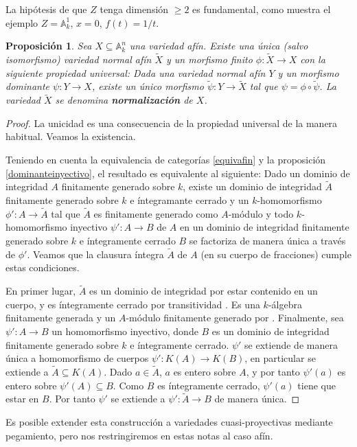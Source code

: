 \documentclass[a4paper,10pt]{book}
\newtheorem{prop}[thm]{Proposición}
\newcommand{\AAA}{\mathbb A}
\newcommand{\Ank}{\AAA^n_k}
\begin{document}
La hipótesis de que $Z$ tenga dimensión $\geq 2$ es fundamental, como muestra el ejemplo $Z=\AAA^1_k$, $x=0$, $f(t)=1/t$.

\begin{prop}
 Sea $X\subseteq\Ank$ una variedad afín. Existe una única (salvo isomorfismo) variedad normal afín $\tilde X$ y un morfismo finito $\phi:\tilde X\to X$ con la siguiente propiedad universal: Dada una variedad normal afín $Y$ y un morfismo dominante $\psi:Y\to X$, existe un único morfismo $\tilde\psi:Y\to\tilde X$ tal que $\psi=\phi\circ\tilde\psi$. La variedad $\tilde X$ se denomina {\bf normalización} de $X$.
\end{prop}

\begin{proof} La unicidad es una consecuencia de la propiedad universal de la manera habitual. Veamos la existencia.

 Teniendo en cuenta la equivalencia de categorías \ref{equivafin} y la proposición \ref{dominanteinyectivo}, el resultado es equivalente al siguiente: Dado un dominio de integridad $A$ finitamente generado sobre $k$, existe un dominio de integridad $\tilde A$ finitamente generado sobre $k$ e íntegramante cerrado y un $k$-homomorfismo $\phi':A\to \tilde A$ tal que $\tilde A$ es finitamente generado como $A$-módulo y todo $k$-homomorfismo inyectivo $\psi':A\to B$ de $A$ en un dominio de integridad finitamente generado sobre $k$ e íntegramente cerrado $B$ se factoriza de manera única a través de $\phi'$. Veamos que la clausura íntegra $\tilde A$ de $A$ (en su cuerpo de fracciones) cumple estas condiciones.

En primer lugar, $\tilde A$ es un dominio de integridad por estar contenido en un cuerpo, y es íntegramente cerrado por transitividad \cite[Corolario 5.4]{am}. Es una $k$-álgebra finitamente generada y un $A$-módulo finitamente generado por \cite[Theorem 3.9A]{h}. Finalmente, sea $\psi':A\to B$ un homomorfismo inyectivo, donde $B$ es un dominio de integridad finitamente generado sobre $k$ e íntegramente cerrado. $\psi'$ se extiende de manera única a homomorfismo de cuerpos $\psi':K(A)\to K(B)$, en particular se extiende a $\tilde A\subseteq K(A)$. Dado $a\in\tilde A$, $a$ es entero sobre $A$, y por tanto $\psi'(a)$ es entero sobre $\psi'(A)\subseteq B$. Como $B$ es íntegramente cerrado, $\psi'(a)$ tiene que estar en $B$. Por tanto $\psi'$ se extiende a $\psi':\tilde A\to B$ de manera única.  
\end{proof}

Es posible extender esta construcción a variedades cuasi-proyectivas mediante pegamiento, pero nos restringiremos en estas notas al caso afín.
\end{document}
